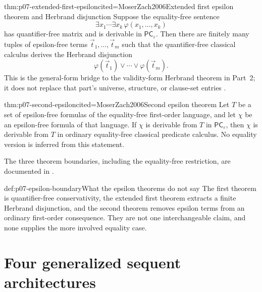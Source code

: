 \begin{hbtheorem}{thm:p07-extended-first-epsilon}{cited=MoserZach2006}{Extended first epsilon theorem and Herbrand disjunction}
Suppose the equality-free sentence
\[
  \exists x_1\cdots\exists x_k\,\varphi(x_1,\ldots,x_k)
\]
has quantifier-free matrix and is derivable in
\(\mathsf{PC}_{\varepsilon}\).  Then there are finitely many tuples of
epsilon-free terms \(\vec t_1,\ldots,\vec t_m\) such that the quantifier-free
classical calculus derives the Herbrand disjunction
\[
  \varphi(\vec t_1)\lor\cdots\lor\varphi(\vec t_m).
\]
This is the general-form bridge to the validity-form Herbrand theorem in
Part~2; it does not replace that part's universe, structure, or clause-set
entries \cite{Herbrand1971,Buss1998,MoserZach2006}.
\end{hbtheorem}

\begin{hbtheorem}{thm:p07-second-epsilon}{cited=MoserZach2006}{Second epsilon theorem}
Let \(T\) be a set of epsilon-free formulas of the equality-free first-order
language, and let \(\chi\) be an epsilon-free formula of that language.  If
\(\chi\) is derivable from \(T\) in
\(\mathsf{PC}_{\varepsilon}\), then \(\chi\) is derivable from \(T\) in
ordinary equality-free classical predicate calculus.  No equality version is
inferred from this statement.
\end{hbtheorem}

The three theorem boundaries, including the equality-free restriction, are
documented in \textcite{MoserZach2006}.

\begin{hbwarning}{def:p07-epsilon-boundary}{What the epsilon theorems do not say}
The first theorem is quantifier-free conservativity, the extended first
theorem extracts a finite Herbrand disjunction, and the second theorem removes
epsilon terms from an ordinary first-order consequence.  They are not one
interchangeable claim, and none supplies the more involved equality case.
\end{hbwarning}

\section{Four generalized sequent architectures}
\label{sec:p07-generalized-sequent-frameworks}

